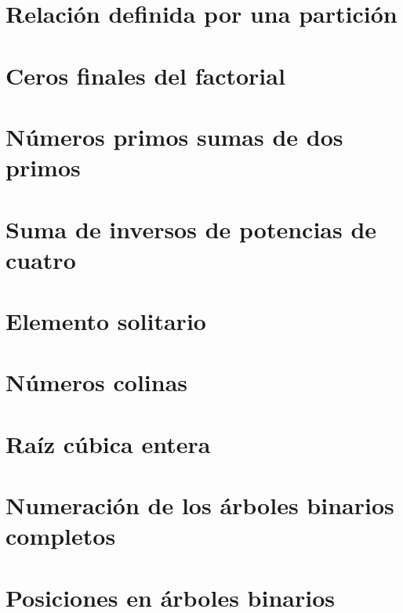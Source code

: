 \documentclass[a4paper,12pt,twoside]{book}
\begin{document}
\chapter{Relación definida por una partición}

\chapter{Ceros finales del factorial}

 
\chapter{Números primos sumas de dos primos}

\chapter{Suma de inversos de potencias de cuatro}

\chapter{Elemento solitario}

\chapter{Números colinas}

\chapter{Raíz cúbica entera}


\chapter{Numeración de los árboles binarios completos}
\label{031218}

\chapter{Posiciones en árboles binarios}
\label{041218}
\end{document}
